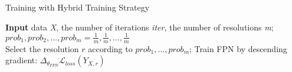 \documentclass{article}
\begin{document}
\begin{algorithm}
    \caption{Training with Hybrid Training Strategy}
    \hspace*{\algorithmicindent} \textbf{Input} data \textit{X}, the number of iterations \textit{iter}, the number of resolutions \textit{m};\\
    $prob_1,prob_2,\ldots,prob_m = \frac{1}{m},\frac{1}{m},\ldots,\frac{1}{m}$\\
    \State Select the resolution $r$ according to \newline  $prob_1, \ldots, prob_m$;
    \State Train FPN by descending gradient: $\Delta_\theta_{FPN}\mathcal{L}_{loss} (Y_{X,r})$
\EndFor
\end{algorithm}
\end{document}
